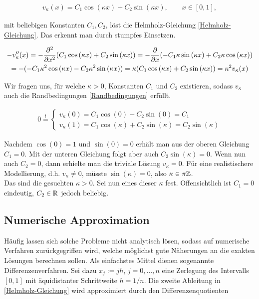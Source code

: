\begin{align}
  v_\kappa(x) = C_1 \cos{(\kappa x)} + C_2 \sin{(\kappa x)}, \qquad
  x \in [0, 1],
  \label{Analytische_Lösung}
\end{align}

mit beliebigen Konstanten $C_1, C_2$, löst die Helmholz-Gleichung \eqref{Helmholz-Gleichung}. Das erkennt man durch stumpfes Einsetzen.

\begin{multline*}
  - v_\kappa^{\prime \prime}(x)
  = - \frac{\partial^2}{\partial x^2}
    (C_1 \cos{(\kappa x)} + C_2 \sin{(\kappa x)})
  = - \frac{\partial}{\partial x}
    (- C_1 \kappa \sin{(\kappa x)} + C_2 \kappa \cos{(\kappa x)}) \\
  = - (- C_1 \kappa^2 \cos{(\kappa x)} - C_2 \kappa^2 \sin{(\kappa x)})
  = \kappa (C_1 \cos{(\kappa x)} + C_2 \sin{(\kappa x)})
  = \kappa^2 v_\kappa(x)
\end{multline*}

Wir fragen uns, für welche $\kappa > 0$, Konstanten $C_1$ und $C_2$ existieren, sodass $v_\kappa$ auch die Randbedingungen \eqref{Randbedingungen} erfüllt.

\begin{align*}
  0 \stackrel{!}{=}
  \begin{cases}
    v_\kappa(0)
    = C_1 \cos{(0)} + C_2 \sin{(0)}
    = C_1 \\
    v_\kappa(1)
    = C_1 \cos{(\kappa)} + C_2 \sin{(\kappa)}
    = C_2 \sin{(\kappa)}
  \end{cases}
\end{align*}

Nachdem $\cos{(0)} = 1$ und $\sin{(0)} = 0$ erhält man aus der oberen Gleichung $C_1 = 0$. Mit der unteren Gleichung folgt aber auch $C_2 \sin{(\kappa)} = 0$. Wenn nun auch $C_2 = 0$, dann erhielte man die triviale Lösung $v_\kappa = 0$. Für eine realistischere Modellierung, d.h. $v_\kappa \neq 0$, müsste $\sin{(\kappa)} = 0$, also $\kappa \in \pi \mathbb{Z}$. \\

Das sind die gesuchten $\kappa > 0$. Sei nun eines dieser $\kappa$ fest. Offensichtlich ist $C_1 = 0$ eindeutig, $C_2 \in \mathbb{R}$ jedoch beliebig.

\subsection{Numerische Approximation}

Häufig lassen sich solche Probleme nicht analytisch lösen, sodass auf numerische Verfahren zurückgegriffen wird, welche möglichst gute Näherungen an die exakten Lösungen berechnen sollen. Als einfachstes Mittel dienen sogenannte Differenzenverfahren. Sei dazu $x_j := jh$, $j = 0, \ldots, n$ eine Zerlegung des Intervalls $[0, 1]$ mit äquidistanter Schrittweite $h = 1/n$. Die zweite Ableitung in \eqref{Helmholz-Gleichung} wird approximiert durch den Differenzenquotienten

